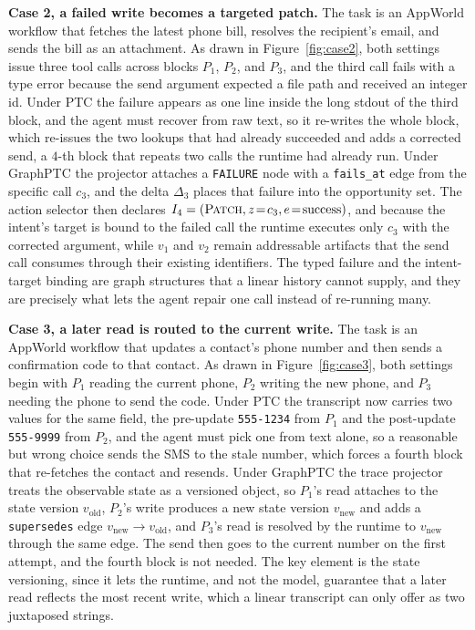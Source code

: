 

\textbf{Case 2, a failed write becomes a targeted patch.}\quad
The task is an AppWorld workflow that fetches the latest phone bill, resolves the recipient's email, and sends the bill as an attachment.
As drawn in Figure~\ref{fig:case2}, both settings issue three tool calls across blocks $P_1$, $P_2$, and $P_3$, and the third call fails with a type error because the send argument expected a file path and received an integer id.
Under PTC the failure appears as one line inside the long stdout of the third block, and the agent must recover from raw text, so it re-writes the whole block, which re-issues the two lookups that had already succeeded and adds a corrected send, a $4$-th block that repeats two calls the runtime had already run.
Under GraphPTC the projector attaches a \texttt{FAILURE} node with a \texttt{fails\_at} edge from the specific call $c_3$, and the delta $\Delta_3$ places that failure into the opportunity set.
The action selector then declares $I_4=(\textsc{Patch}, z\!=\!c_3, e\!=\!\text{success})$, and because the intent's target is bound to the failed call the runtime executes only $c_3$ with the corrected argument, while $v_1$ and $v_2$ remain addressable artifacts that the send call consumes through their existing identifiers.
The typed failure and the intent-target binding are graph structures that a linear history cannot supply, and they are precisely what lets the agent repair one call instead of re-running many.



\textbf{Case 3, a later read is routed to the current write.}\quad
The task is an AppWorld workflow that updates a contact's phone number and then sends a confirmation code to that contact.
As drawn in Figure~\ref{fig:case3}, both settings begin with $P_1$ reading the current phone, $P_2$ writing the new phone, and $P_3$ needing the phone to send the code.
Under PTC the transcript now carries two values for the same field, the pre-update \texttt{555-1234} from $P_1$ and the post-update \texttt{555-9999} from $P_2$, and the agent must pick one from text alone, so a reasonable but wrong choice sends the SMS to the stale number, which forces a fourth block that re-fetches the contact and resends.
Under GraphPTC the trace projector treats the observable state as a versioned object, so $P_1$'s read attaches to the state version $v_{\text{old}}$, $P_2$'s write produces a new state version $v_{\text{new}}$ and adds a \texttt{supersedes} edge $v_{\text{new}}\!\to\!v_{\text{old}}$, and $P_3$'s read is resolved by the runtime to $v_{\text{new}}$ through the same edge.
The send then goes to the current number on the first attempt, and the fourth block is not needed.
The key element is the state versioning, since it lets the runtime, and not the model, guarantee that a later read reflects the most recent write, which a linear transcript can only offer as two juxtaposed strings.


